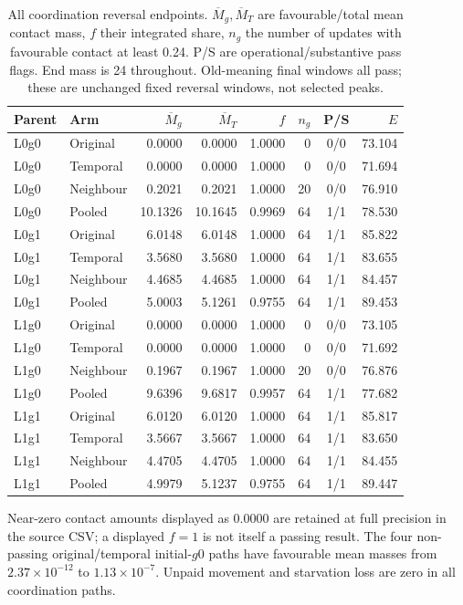 \begin{table}[htbp]\centering\scriptsize
\caption{All coordination reversal endpoints. $\overline M_g,\overline M_T$ are favourable/total mean contact mass, $f$ their integrated share, $n_g$ the number of updates with favourable contact at least 0.24. P/S are operational/substantive pass flags. End mass is 24 throughout. Old-meaning final windows all pass; these are unchanged fixed reversal windows, not selected peaks.}\label{tab:coordination-outcomes}
\setlength{\tabcolsep}{3.5pt}\begin{tabular}{llrrrrcr}\toprule
Parent & Arm & $\overline M_g$ & $\overline M_T$ & $f$ & $n_g$ & P/S & $E$\\\midrule
L0g0 & Original & 0.0000 & 0.0000 & 1.0000 & 0 & 0/0 & 73.104 \\
L0g0 & Temporal & 0.0000 & 0.0000 & 1.0000 & 0 & 0/0 & 71.694 \\
L0g0 & Neighbour & 0.2021 & 0.2021 & 1.0000 & 20 & 0/0 & 76.910 \\
L0g0 & Pooled & 10.1326 & 10.1645 & 0.9969 & 64 & 1/1 & 78.530 \\
L0g1 & Original & 6.0148 & 6.0148 & 1.0000 & 64 & 1/1 & 85.822 \\
L0g1 & Temporal & 3.5680 & 3.5680 & 1.0000 & 64 & 1/1 & 83.655 \\
L0g1 & Neighbour & 4.4685 & 4.4685 & 1.0000 & 64 & 1/1 & 84.457 \\
L0g1 & Pooled & 5.0003 & 5.1261 & 0.9755 & 64 & 1/1 & 89.453 \\
L1g0 & Original & 0.0000 & 0.0000 & 1.0000 & 0 & 0/0 & 73.105 \\
L1g0 & Temporal & 0.0000 & 0.0000 & 1.0000 & 0 & 0/0 & 71.692 \\
L1g0 & Neighbour & 0.1967 & 0.1967 & 1.0000 & 20 & 0/0 & 76.876 \\
L1g0 & Pooled & 9.6396 & 9.6817 & 0.9957 & 64 & 1/1 & 77.682 \\
L1g1 & Original & 6.0120 & 6.0120 & 1.0000 & 64 & 1/1 & 85.817 \\
L1g1 & Temporal & 3.5667 & 3.5667 & 1.0000 & 64 & 1/1 & 83.650 \\
L1g1 & Neighbour & 4.4705 & 4.4705 & 1.0000 & 64 & 1/1 & 84.455 \\
L1g1 & Pooled & 4.9979 & 5.1237 & 0.9755 & 64 & 1/1 & 89.447 \\
\bottomrule\end{tabular}\end{table}\FloatBarrier

Near-zero contact amounts displayed as 0.0000 are retained at full precision in the source CSV; a displayed $f=1$ is not itself a passing result. The four non-passing original/temporal initial-$g0$ paths have favourable mean masses from $2.37\times10^{-12}$ to $1.13\times10^{-7}$. Unpaid movement and starvation loss are zero in all coordination paths.

